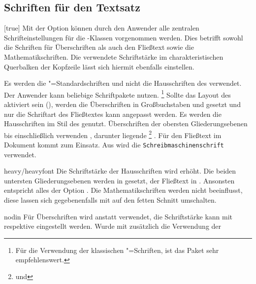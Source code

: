 \begin{Declaration*}{}
\begin{Declaration*}{}
\begin{Declaration*}{}
\subsection{Schriften für den Textsatz}
%
%
%
\begin{Declaration}[%
  v2.02!\Option{cdfont=head};
  v2.02!\Option{cdfont=heavyhead};
  v2.03!\Option{cdfont=din};
  v2.03!\Option{cdfont=nodin};
]{}[true]%
\printdeclarationlist%
%
Mit der Option  können durch den Anwender alle zentralen 
Schrifteinstellungen für die \TUDScript-Klassen vorgenommen werden. Dies 
betrifft sowohl die Schriften für Überschriften als auch den Fließtext sowie 
die Mathematikschriften. Die verwendete Schriftstärke im charakteristischen 
Querbalken der Kopfzeile lässt sich hiermit ebenfalls einstellen.
%
\begin{values}{}
\itemfalse
  Es werden die "=Standardschriften und nicht die Hausschriften 
  des \CDs verwendet. Der Anwender kann beliebige Schriftpakete nutzen.%
  \footnote{%
    Für die Verwendung der klassischen "=Schriften, ist das Paket 
     sehr empfehlenswert.%
  }
  Sollte das Layout des \CDs aktiviert sein (), werden die 
  Überschriften in Großbuchstaben und \DIN gesetzt und nur die Schriftart des 
  Fließtextes kann angepasst werden.
  Es werden die Hausschriften im Stil des \TUDCDs genutzt. Überschriften der 
  obersten Gliederungsebenen bis einschließlich  
  verwenden \DIN, darunter liegende%
  \footnote{ und } 
  . Für den Fließtext im Dokument kommt 
   zum Einsatz. Aus  wird die
  \texttt{Schreibmaschinenschrift} verwendet.
\item[heavy/heavyfont]
  Die Schriftstärke der Hausschriften wird erhöht. Die beiden untersten 
  Gliederungsebenen werden in  gesetzt, der Fließtext 
  in . Ansonsten entspricht alles der Option 
  . Die Mathematikschriften werden nicht beeinflusst, 
  diese lassen sich gegebenenfalls mit  auf den fetten Schnitt 
  umschalten.
\item[nodin]
  Für Überschriften wird \Univers anstatt \DIN verwendet, die Schriftstärke 
  kann mit  respektive  eingestellt 
  werden. Wurde mit  zusätzlich die Verwendung der 

\end{values}
\end{Declaration}
\end{Declaration*}
\end{Declaration*}
\end{Declaration*}
